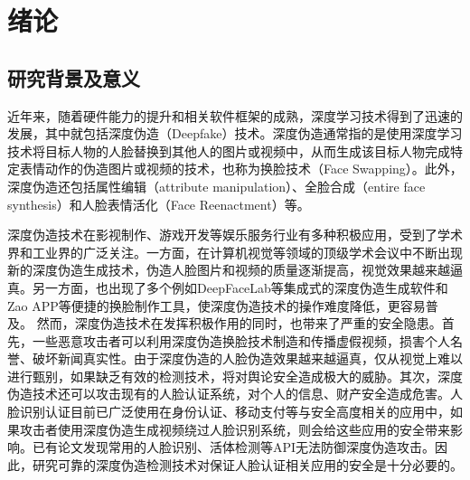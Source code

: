 \chapter{绪论}

\section{研究背景及意义}

近年来，随着硬件能力的提升和相关软件框架的成熟，深度学习技术得到了迅速的发展，其中就包括深度伪造（Deepfake）技术。深度伪造通常指的是使用深度学习技术将目标人物的人脸替换到其他人的图片或视频中，从而生成该目标人物完成特定表情动作的伪造图片或视频的技术，也称为换脸技术（Face Swapping）\cite{nguyen2022deep}。此外，深度伪造还包括属性编辑（attribute manipulation）、全脸合成（entire face synthesis）\cite{tolosana2020deepfakes}和人脸表情活化（Face Reenactment）\cite{hsu2022dual}等。  

深度伪造技术在影视制作、游戏开发等娱乐服务行业有多种积极应用，受到了学术界和工业界的广泛关注。一方面，在计算机视觉等领域的顶级学术会议中不断出现新的深度伪造生成技术\cite{hsu2022dual, chen2020simswap, li2020advancing, zhu2021one, xu2022high}，伪造人脸图片和视频的质量逐渐提高，视觉效果越来越逼真。另一方面，也出现了多个例如DeepFaceLab\cite{Deepfacelab}等集成式的深度伪造生成软件和Zao APP等便捷的换脸制作工具，使深度伪造技术的操作难度降低，更容易普及。
然而，深度伪造技术在发挥积极作用的同时，也带来了严重的安全隐患。首先，一些恶意攻击者可以利用深度伪造换脸技术制造和传播虚假视频，损害个人名誉、破坏新闻真实性\cite{李旭嵘2020}。由于深度伪造的人脸伪造效果越来越逼真，仅从视觉上难以进行甄别，如果缺乏有效的检测技术，将对舆论安全造成极大的威胁。其次，深度伪造技术还可以攻击现有的人脸认证系统，对个人的信息、财产安全造成危害。人脸识别认证目前已广泛使用在身份认证、移动支付等与安全高度相关的应用中，如果攻击者使用深度伪造生成视频绕过人脸识别系统，则会给这些应用的安全带来影响。已有论文发现常用的人脸识别、活体检测等API无法防御深度伪造攻击\cite{tariq2022real, li2022seeing}。因此，研究可靠的深度伪造检测技术对保证人脸认证相关应用的安全是十分必要的。

